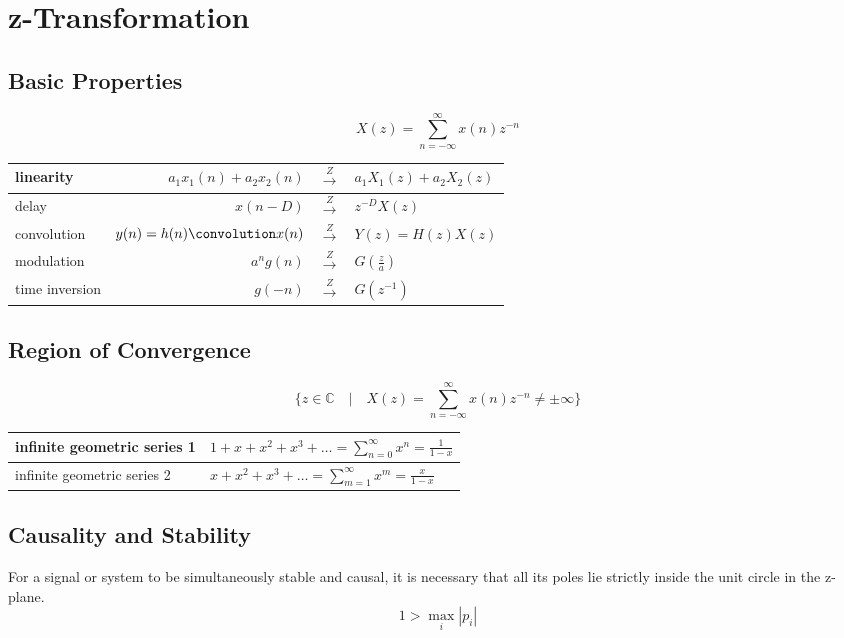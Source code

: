 \section{z-Transformation}

\subsection{Basic Properties}

\[
	X(z) = \sum\limits_{n=-\infty}^\infty x(n)z^{-n}
\]

\begin{tabularx}{0.6\textwidth}{|l|r>{\centering}Xl|}
	\hline
	linearity & $a_1x_1(n) + a_2x_2(n)$ & $\overset{Z}{\longrightarrow}$ & $a_1X_1(z) + a_2X_2(z)$
	\\ \hline
	delay	& $x(n-D)$ & $\overset{Z}{\longrightarrow}$ & $z^{-D}X(z)$
	\\ \hline
	convolution & $y(n) = h(n) \convolution x(n)$ & $\overset{Z}{\longrightarrow}$ & $Y(z) = H(z)X(z)$
	\\ \hline
	modulation & $a^n g(n)$ & $\overset{Z}{\longrightarrow}$ & $G(\frac{z}{a})$
	\\ \hline
	time inversion & $g(-n)$ & $\overset{Z}{\longrightarrow}$ & $G(z^{-1})$
	\\ \hline
\end{tabularx}


\subsection{Region of Convergence}

\[
	\{ z \in \mathbb{C} \quad | \quad X(z) = \sum\limits_{n=-\infty}^{\infty} x(n)z^{-n} \neq \pm \infty \}
\]

\begin{tabularx}{0.6\textwidth}{|l|X|}
	\hline
	infinite geometric series 1 & $1 + x + x^2 + x^3 + \ldots = \sum\limits_{n=0}^{\infty} x^n = \frac{1}{1-x}$
	\\ \hline
	infinite geometric series 2 & $x + x^2 + x^3 + \ldots = \sum\limits_{m=1}^{\infty} x^m = \frac{x}{1-x}$
	\\ \hline
\end{tabularx}


\subsection{Causality and Stability}

For a signal or system to be simultaneously stable and causal, it is necessary that all its poles lie strictly inside the unit circle in the z-plane. 
\[ 1 > \max\limits_{i}|p_i| \]

